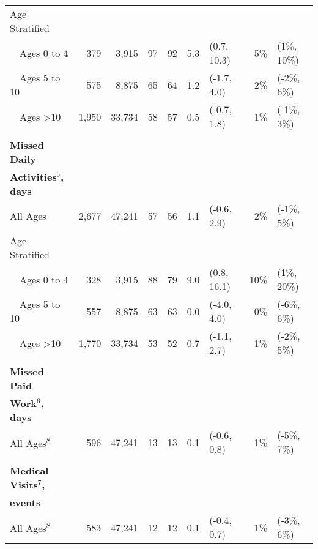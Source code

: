 \documentclass[12pt]{article}\usepackage[]{graphicx}\usepackage[]{color}
\begin{document}
\begin{table}[h!tb]
\begin{footnotesize}
\begin{center}
\begin{tabular}{l rr cc rl rl}
Age Stratified \\
 ~~Ages 0 to 4 & 379 & 3,915 & 97 & 92 & 5.3 & (0.7, 10.3) & 5\% & (1\%, 10\%) \\ 
 ~~Ages 5 to 10 & 575 & 8,875 & 65 & 64 & 1.2 & (-1.7, 4.0) & 2\% & (-2\%, 6\%) \\ 
 ~~Ages >10 & 1,950 & 33,734 & 58 & 57 & 0.5 & (-0.7, 1.8) & 1\% & (-1\%, 3\%) \\ 
  
& \\
\textbf{Missed Daily} \\
\textbf{Activities$^5$, days} \\
 All Ages & 2,677 & 47,241 & 57 & 56 & 1.1 & (-0.6, 2.9) & 2\% & (-1\%, 5\%) \\ 
  
Age Stratified \\
 ~~Ages 0 to 4 & 328 & 3,915 & 88 & 79 & 9.0 & (0.8, 16.1) & 10\% & (1\%, 20\%) \\ 
 ~~Ages 5 to 10 & 557 & 8,875 & 63 & 63 & 0.0 & (-4.0, 4.0) & 0\% & (-6\%, 6\%) \\ 
 ~~Ages >10 & 1,770 & 33,734 & 53 & 52 & 0.7 & (-1.1, 2.7) & 1\% & (-2\%, 5\%) \\ 
  
& \\
\textbf{Missed Paid} \\
\textbf{Work$^6$, days} \\
 All Ages\textsuperscript{8} & 596 & 47,241 & 13 & 13 & 0.1 & (-0.6, 0.8) & 1\% & (-5\%, 7\%) \\ 
  
& \\
\textbf{Medical Visits$^7$,} \\
\textbf{events} \\
 All Ages\textsuperscript{8} & 583 & 47,241 & 12 & 12 & 0.1 & (-0.4, 0.7) & 1\% & (-3\%, 6\%) \\ 
  

\end{tabular}
\end{center}
\end{footnotesize}
\end{table}
\end{document}
